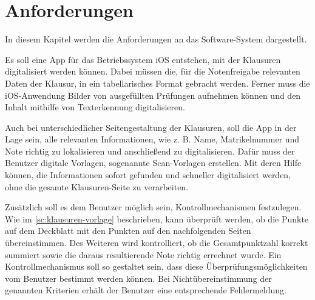 \documentclass[notables, nomenclature, oneside, 150]{HSMW-Thesis}
\begin{document}


\chapter{Anforderungen}\label{ch:anforderungen}
	In diesem Kapitel werden die Anforderungen an das Software-System dargestellt.

	Es soll eine App für das Betriebssystem iOS entstehen, mit der Klausuren digitalisiert werden können. Dabei müssen die, für die Notenfreigabe relevanten Daten der Klausur, in ein tabellarisches Format gebracht werden. Ferner muss die iOS-Anwendung Bilder von ausgefüllten Prüfungen aufnehmen können und den Inhalt mithilfe von Texterkennung digitalisieren. 
	
	Auch bei unterschiedlicher Seitengestaltung der Klausuren, soll die App in der Lage sein, alle relevanten Informationen, wie z. B. Name, Matrikelnummer und Note richtig zu lokalisieren und anschließend zu digitalisieren. Dafür muss der Benutzer digitale Vorlagen, sogenannte Scan-Vorlagen erstellen. Mit deren Hilfe können, die Informationen sofort gefunden und schneller digitalisiert werden, ohne die gesamte Klausuren-Seite zu verarbeiten. 

	Zusätzlich soll es dem Benutzer möglich sein, Kontrollmechanismen festzulegen. Wie im \autoref{sc:klausuren-vorlage} beschrieben, kann überprüft werden, ob die Punkte auf dem Deckblatt mit den Punkten auf den nachfolgenden Seiten übereinstimmen. Des Weiteren wird kontrolliert, ob die Gesamtpunktzahl korrekt summiert sowie die daraus resultierende Note richtig errechnet wurde. Ein Kontrollmechanismus soll so gestaltet sein, dass diese Überprüfungsmöglichkeiten vom Benutzer bestimmt werden können. Bei Nichtübereinstimmung der genannten Kriterien erhält der Benutzer eine entsprechende Fehlermeldung. %
 
\end{document}
